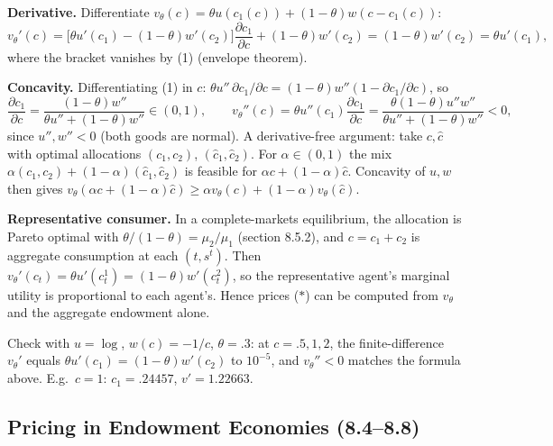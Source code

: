 \documentclass[12pt, letterpaper]{article}
\begin{document}
\begin{tcolorbox}[oddbox,title={Exercise 8.3 \quad Existence of representative consumer}]
\textbf{Derivative.} Differentiate $v_\theta(c)=\theta u(c_1(c))+(1-\theta)w(c-c_1(c))$:
\[
v_\theta'(c)=\big[\theta u'(c_1)-(1-\theta)w'(c_2)\big]\frac{\partial c_1}{\partial c}+(1-\theta)w'(c_2)
=(1-\theta)w'(c_2)=\theta u'(c_1),
\]
where the bracket vanishes by (1) (envelope theorem).

\textbf{Concavity.} Differentiating (1) in $c$:
$\theta u''\,\partial c_1/\partial c=(1-\theta)w''(1-\partial c_1/\partial c)$, so
\[
\frac{\partial c_1}{\partial c}=\frac{(1-\theta)w''}{\theta u''+(1-\theta)w''}\in(0,1),\qquad
v_\theta''(c)=\theta u''(c_1)\frac{\partial c_1}{\partial c}=\frac{\theta(1-\theta)u''w''}{\theta u''+(1-\theta)w''}<0 ,
\]
since $u'',w''<0$ (both goods are normal). A derivative-free argument: take $c,\hat c$ with optimal
allocations $(c_1,c_2)$, $(\hat c_1,\hat c_2)$. For $\alpha\in(0,1)$ the mix $\alpha(c_1,c_2)+(1-\alpha)(\hat c_1,\hat c_2)$
is feasible for $\alpha c+(1-\alpha)\hat c$. Concavity of $u,w$ then gives
$v_\theta(\alpha c+(1-\alpha)\hat c)\ge\alpha v_\theta(c)+(1-\alpha)v_\theta(\hat c)$.

\textbf{Representative consumer.} In a complete-markets equilibrium, the allocation is Pareto optimal with
$\theta/(1-\theta)=\mu_2/\mu_1$ (section 8.5.2), and $c=c_1+c_2$ is aggregate consumption at each $(t,s^t)$.
Then $v_\theta'(c_t)=\theta u'(c^1_t)=(1-\theta)w'(c^2_t)$, so the representative agent's marginal utility
is proportional to each agent's. Hence prices ($\ast$) can be computed from $v_\theta$ and the aggregate
endowment alone.

\begin{tcolorbox}[databox]
Check with $u=\log$, $w(c)=-1/c$, $\theta=.3$: at $c=.5,1,2$, the finite-difference $v_\theta'$ equals
$\theta u'(c_1)=(1-\theta)w'(c_2)$ to $10^{-5}$, and $v_\theta''<0$ matches the formula above. E.g.\ $c=1$: $c_1=.24457$,
$v'=1.22663$.
\end{tcolorbox}
\end{tcolorbox}

\subsection{Pricing in Endowment Economies (8.4--8.8)}
\end{document}

